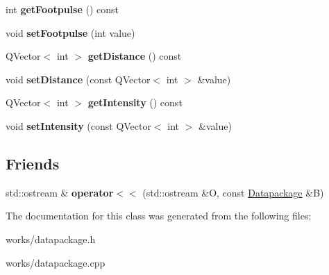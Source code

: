 \begin{DoxyCompactItemize}
\item 
\hypertarget{classDatapackage_a0de5f4d73a9d8e33c9b817462bd340bf}{int {\bfseries get\-Footpulse} () const }\label{classDatapackage_a0de5f4d73a9d8e33c9b817462bd340bf}

\item 
\hypertarget{classDatapackage_abebf5c2641e3b0223318791e86936a3a}{void {\bfseries set\-Footpulse} (int value)}\label{classDatapackage_abebf5c2641e3b0223318791e86936a3a}

\item 
\hypertarget{classDatapackage_a28c2d73d6d15bdd3635941b981f978bb}{Q\-Vector$<$ int $>$ {\bfseries get\-Distance} () const }\label{classDatapackage_a28c2d73d6d15bdd3635941b981f978bb}

\item 
\hypertarget{classDatapackage_a2507cd1bcd5717ad06d89be62a169251}{void {\bfseries set\-Distance} (const Q\-Vector$<$ int $>$ \&value)}\label{classDatapackage_a2507cd1bcd5717ad06d89be62a169251}

\item 
\hypertarget{classDatapackage_a9c9a0bd967182db48f9bbb884c57232b}{Q\-Vector$<$ int $>$ {\bfseries get\-Intensity} () const }\label{classDatapackage_a9c9a0bd967182db48f9bbb884c57232b}

\item 
\hypertarget{classDatapackage_a2031be7b427a8b9e0ff2d4c6085b0061}{void {\bfseries set\-Intensity} (const Q\-Vector$<$ int $>$ \&value)}\label{classDatapackage_a2031be7b427a8b9e0ff2d4c6085b0061}

\end{DoxyCompactItemize}
\subsection*{Friends}
\begin{DoxyCompactItemize}
\item 
\hypertarget{classDatapackage_a090ef798bfd6ea5aa522acadb4406f08}{std\-::ostream \& {\bfseries operator$<$$<$} (std\-::ostream \&O, const \hyperlink{classDatapackage}{Datapackage} \&B)}\label{classDatapackage_a090ef798bfd6ea5aa522acadb4406f08}

\end{DoxyCompactItemize}


The documentation for this class was generated from the following files\-:\begin{DoxyCompactItemize}
\item 
works/datapackage.\-h\item 
works/datapackage.\-cpp\end{DoxyCompactItemize}
